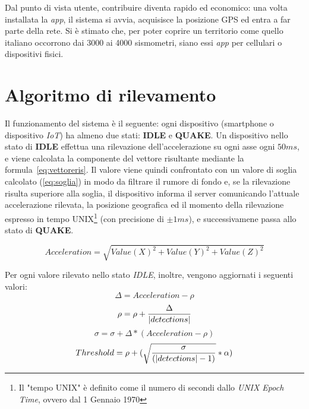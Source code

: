 \documentclass[a4paper,10pt]{memoir}
\begin{document}
Dal punto di vista utente, contribuire diventa rapido ed economico: una volta installata la \textit{app}, il sistema si avvia, acquisisce la posizione GPS ed entra a far parte della rete. Si è stimato che, per poter coprire un territorio come quello italiano occorrono dai 3000 ai 4000 sismometri, siano essi \textit{app} per cellulari o dispositivi fisici.

\pagebreak

\section{Algoritmo di rilevamento}

Il funzionamento del sistema è il seguente: ogni dispositivo (smartphone o dispositivo \textit{IoT}) ha almeno due stati: \textbf{IDLE} e \textbf{QUAKE}. Un dispositivo nello stato di \textbf{IDLE} effettua una rilevazione dell'accelerazione su ogni asse ogni $50ms$, e viene calcolata la componente del vettore risultante mediante la formula~\ref{eq:vettoreris}. Il valore viene quindi confrontato con un valore di soglia calcolato (\ref{eq:soglia}) in modo da filtrare il rumore di fondo e, se la rilevazione risulta superiore alla soglia, il dispositivo informa il server comunicando l'attuale accelerazione rilevata, la posizione geografica ed il momento della rilevazione espresso in tempo UNIX\footnote{Il "tempo UNIX" è definito come il numero di secondi dallo \textit{UNIX Epoch Time}, ovvero dal 1 Gennaio 1970} (con precisione di $\pm1ms$), e successivamene passa allo stato di \textbf{QUAKE}.

\begin{equation} \label{eq:vettoreris}
Acceleration = \sqrt{Value(X)^2 + Value(Y)^2 + Value(Z)^2}
\end{equation}

Per ogni valore rilevato nello stato \textit{IDLE}, inoltre, vengono aggiornati i seguenti valori:
\begin{equation}
\Delta = Acceleration - \rho
\end{equation}
\begin{equation}
\rho = \rho + {\Delta \over |detections|}
\end{equation}
\begin{equation}
\sigma = \sigma + \Delta * (Acceleration - \rho)
\end{equation}
\begin{equation} \label{eq:soglia}
Threshold = \rho + (\sqrt{\sigma \over (|detections|-1)} * \alpha)
\end{equation}
\end{document}

